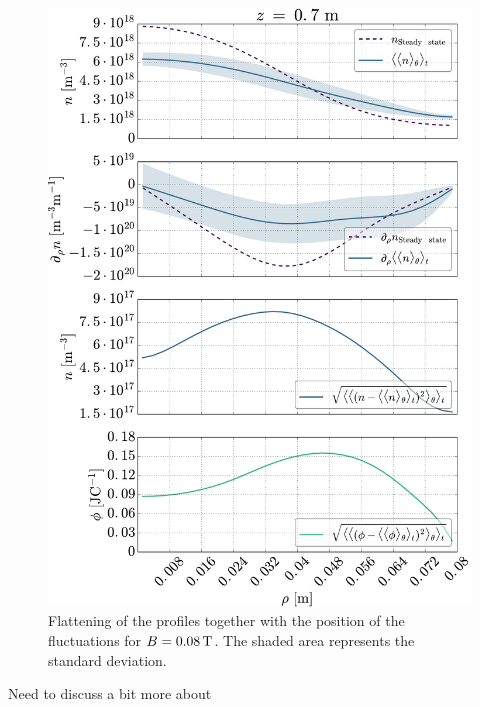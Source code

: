 \begin{figure}[htb]
    \centering
    \includegraphics[width=1.0\textwidth]{fig/results/posOfFluct/posOfFluctB008}
    \caption{Flattening of the profiles together with the position of the fluctuations for $B=0.08\, \text{T}$.
        The shaded area represents the standard deviation.
    }
    \label{fig:posOfFluct008}
\end{figure}
%
Need to discuss a bit more about
